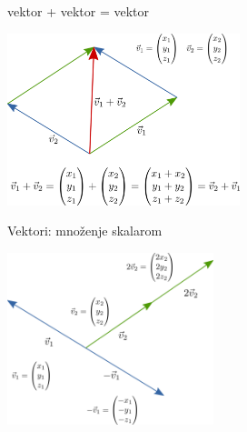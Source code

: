 \documentclass[9pt]{beamer}
\begin{document}
\begin{frame}{vektor + vektor = vektor}
	\begin{center}
		\includegraphics[height=5cm]{./slike/linear_algebra_vector_plus_vector.png}
	\end{center}
\end{frame}

\begin{frame}{Vektori: množenje skalarom}
	\begin{center}
		\includegraphics[height=5cm]{./slike/linear_algebra_vector_operations.png}
	\end{center}
\end{frame}
\end{document}
